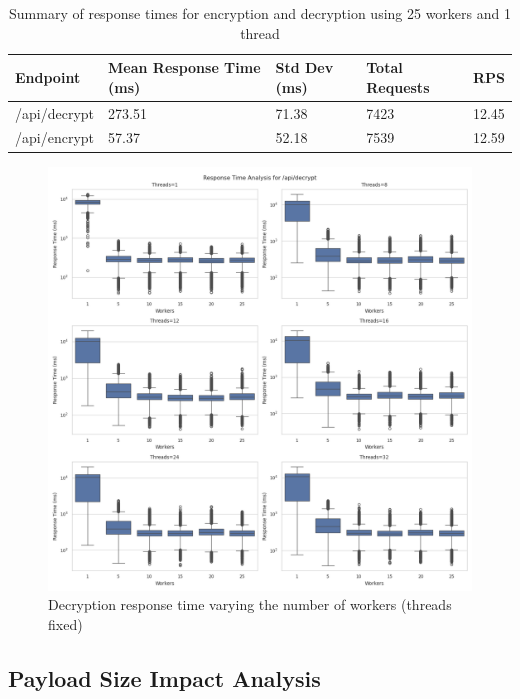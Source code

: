 \documentclass[cic,tc,english]{iiufrgs}
\begin{document}
        \begin{table}
                \centering
                \begin{tabular}{|l|l|l|l|l|}
                \hline
                    Endpoint & Mean Response Time (ms) & Std Dev (ms) & Total Requests & RPS \\ \hline
                    /api/decrypt & 273.51 & 71.38 & 7423 & 12.45 \\ \hline
                    /api/encrypt & 57.37 & 52.18 & 7539 & 12.59 \\ \hline
                \end{tabular}
                \caption{Summary of response times for encryption and decryption using 25 workers and 1 thread}
                \label{tab:response_times}
            \end{table}

        \begin{figure}
            \centering
            \includegraphics[width=\textwidth]{images/phase1/api_decrypt/response_time_threads_summary.png}
            \caption{Decryption response time varying the number of workers (threads fixed)}
            \label{fig:decrypt_response_time_threads}
        \end{figure}


        \subsection{Payload Size Impact Analysis}
        \label{subsec:phase2_payload}
\end{document}
